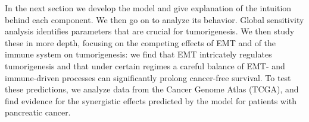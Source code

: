 \documentclass[11pt]{article}
\begin{document}
\par 
In the next section we develop the model and give explanation of the intuition behind each component. We then go on to analyze its behavior. Global sensitivity analysis identifies parameters that are crucial for tumorigenesis. We then study these in more depth, focusing on the competing effects of EMT and of the immune system on tumorigenesis: we find that EMT intricately regulates tumorigenesis and that under certain regimes a careful balance of EMT- and immune-driven processes can significantly prolong cancer-free survival. To test these predictions, we analyze data from the Cancer Genome Atlas (TCGA), and find evidence for the synergistic effects predicted by the model for patients with pancreatic cancer. 




%

\end{document}
